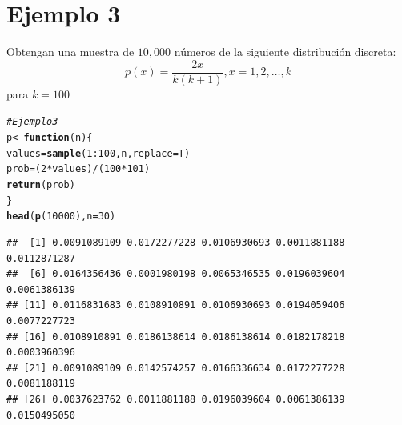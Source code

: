 \documentclass[10pt]{article}\usepackage[]{graphicx}\usepackage[]{xcolor}
\makeatletter
\newcommand{\hlnum}[1]{\textcolor[rgb]{0.686,0.059,0.569}{#1}}%
\newcommand{\hlcom}[1]{\textcolor[rgb]{0.678,0.584,0.686}{\textit{#1}}}%
\newcommand{\hlopt}[1]{\textcolor[rgb]{0,0,0}{#1}}%
\newcommand{\hlstd}[1]{\textcolor[rgb]{0.345,0.345,0.345}{#1}}%
\newcommand{\hlkwa}[1]{\textcolor[rgb]{0.161,0.373,0.58}{\textbf{#1}}}%
\newcommand{\hlkwb}[1]{\textcolor[rgb]{0.69,0.353,0.396}{#1}}%
\newcommand{\hlkwc}[1]{\textcolor[rgb]{0.333,0.667,0.333}{#1}}%
\newcommand{\hlkwd}[1]{\textcolor[rgb]{0.737,0.353,0.396}{\textbf{#1}}}%
\newenvironment{kframe}{%
 \def\at@end@of@kframe{}%
 \ifinner\ifhmode%
  \def\at@end@of@kframe{\end{minipage}}%
  \begin{minipage}{\columnwidth}%
 \fi\fi%
 \def\FrameCommand##1{\hskip\@totalleftmargin \hskip-\fboxsep
 \colorbox{shadecolor}{##1}\hskip-\fboxsep
     \hskip-\linewidth \hskip-\@totalleftmargin \hskip\columnwidth}%
 \MakeFramed {\advance\hsize-\width
   \@totalleftmargin\z@ \linewidth\hsize
   \@setminipage}}%
 {\par\unskip\endMakeFramed%
 \at@end@of@kframe}
\newenvironment{knitrout}{}{} %
\makeatother
\begin{document}
\section{Ejemplo 3}
Obtengan una muestra de $10,000$ números de la siguiente distribución discreta:
$$
p(x)=\frac{2 x}{k(k+1)}, x=1,2, \ldots, k
$$
para $k=100$
\begin{knitrout}
\color{fgcolor}\begin{kframe}
\begin{alltt}
\hlcom{#Ejemplo 3}
\hlstd{p}\hlkwb{<-}\hlkwa{function}\hlstd{(}\hlkwc{n}\hlstd{)\{}
  \hlstd{values}\hlkwb{=}\hlkwd{sample}\hlstd{(}\hlnum{1}\hlopt{:}\hlnum{100}\hlstd{,n,}\hlkwc{replace}\hlstd{=T)}
  \hlstd{prob}\hlkwb{=}\hlstd{(}\hlnum{2}\hlopt{*}\hlstd{values)}\hlopt{/}\hlstd{(}\hlnum{100}\hlopt{*}\hlnum{101}\hlstd{)}
  \hlkwd{return}\hlstd{(prob)}
\hlstd{\}}
\hlkwd{head}\hlstd{(}\hlkwd{p}\hlstd{(}\hlnum{10000}\hlstd{),}\hlkwc{n}\hlstd{=}\hlnum{30}\hlstd{)}
\end{alltt}
\begin{verbatim}
##  [1] 0.0091089109 0.0172277228 0.0106930693 0.0011881188 0.0112871287
##  [6] 0.0164356436 0.0001980198 0.0065346535 0.0196039604 0.0061386139
## [11] 0.0116831683 0.0108910891 0.0106930693 0.0194059406 0.0077227723
## [16] 0.0108910891 0.0186138614 0.0186138614 0.0182178218 0.0003960396
## [21] 0.0091089109 0.0142574257 0.0166336634 0.0172277228 0.0081188119
## [26] 0.0037623762 0.0011881188 0.0196039604 0.0061386139 0.0150495050
\end{verbatim}
\end{kframe}
\end{knitrout}
\end{document}
